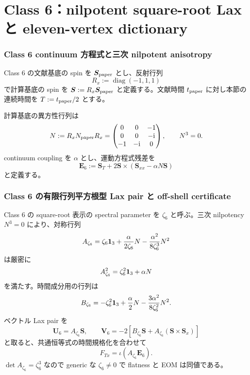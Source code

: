 \part{Class 6：nilpotent square-root Lax と eleven-vertex dictionary}

\section{Class 6 continuum 方程式と三次 nilpotent anisotropy}
Class 6 の文献基底の spin を $\boldsymbol S_{\rm paper}$ とし、反射行列
\begin{equation}
R_x:=\operatorname{diag}(-1,1,1)
\end{equation}
で計算基底の spin を $\boldsymbol S:=R_x\boldsymbol S_{\rm paper}$ と定義する。文献時間 $t_{\rm paper}$ に対し本節の連続時間を $T:=t_{\rm paper}/2$ とする。

計算基底の異方性行列は
\begin{equation}
N:=R_xN_{\rm paper}R_x
=\begin{pmatrix}0&0&-1\\0&0&-\mathrm i\\-1&-\mathrm i&0\end{pmatrix},
\qquad N^3=0.
\label{eq:N6}
\end{equation}
continuum coupling を $\alpha$ とし、運動方程式残差を
\begin{equation}
\boldsymbol E_6:=\boldsymbol S_T+2\boldsymbol S\times(\boldsymbol S_{xx}-\alpha N\boldsymbol S)
\label{eq:E6res}
\end{equation}
と定義する。

\section{Class 6 の有限行列平方根型 Lax pair と off-shell certificate}
Class 6 の square-root 表示の spectral parameter を $\zeta_6$ と呼ぶ。三次 nilpotency $N^3=0$ により、対称行列
\begin{equation}
A_{\zeta_6}=\zeta_6\mathbf 1_{3}+\frac{\alpha}{2\zeta_6}N
-\frac{\alpha^2}{8\zeta_6^3}N^2
\label{eq:A6}
\end{equation}
は厳密に
\begin{equation}
A_{\zeta_6}^2=\zeta_6^2\mathbf 1_{3}+\alpha N
\end{equation}
を満たす。時間成分用の行列は
\begin{equation}
B_{\zeta_6}=-\zeta_6^2\mathbf 1_{3}+\frac\alpha2N-
\frac{3\alpha^2}{8\zeta_6^2}N^2.
\label{eq:B6}
\end{equation}
ベクトル Lax pair を
\begin{equation}
\boldsymbol U_6=A_{\zeta_6}\boldsymbol S,
\qquad
\boldsymbol V_6=-2\left[B_{\zeta_6}\boldsymbol S+A_{\zeta_6}(\boldsymbol S\times\boldsymbol S_x)\right]
\label{eq:Lax6}
\end{equation}
と取ると、共通恒等式の時間規格化を合わせて
\begin{equation}
F_{Tx}=\iota(A_{\zeta_6}\boldsymbol E_6).
\label{eq:QE6}
\end{equation}
$\det A_{\zeta_6}=\zeta_6^3$ なので generic な $\zeta_6\neq0$ で flatness と EOM は同値である。

